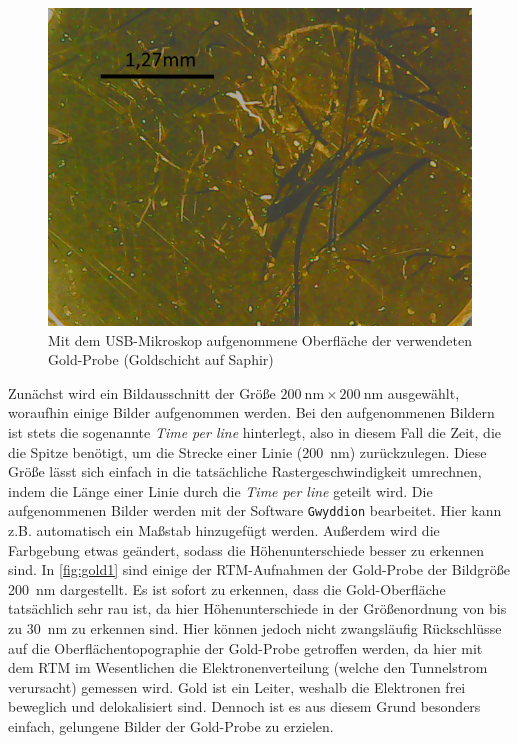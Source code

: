 \begin{figure}[H]
	\centering
	\includegraphics[width=0.6\linewidth]{../figs/gold_saphir.png}
	\caption{Mit dem USB-Mikroskop aufgenommene Oberfläche der verwendeten Gold-Probe (Goldschicht auf Saphir)}
	\label{fig:gold_saphir}
\end{figure}
Zunächst wird ein Bildausschnitt der Größe $\SI{200}{\nano \meter} \times \SI{200}{\nano \meter}$ ausgewählt, woraufhin einige Bilder aufgenommen werden.
Bei den aufgenommenen Bildern ist stets die sogenannte \textit{Time per line} hinterlegt, also in diesem Fall die Zeit, die die Spitze benötigt, um die Strecke
einer Linie (\SI{200}{\nano \meter}) zurückzulegen. Diese Größe lässt sich einfach in die tatsächliche Rastergeschwindigkeit umrechnen, indem die Länge einer Linie
durch die \textit{Time per line} geteilt wird. Die aufgenommenen Bilder werden mit der Software \texttt{Gwyddion} bearbeitet. Hier kann z.B. automatisch
ein Maßstab hinzugefügt werden. Außerdem wird die Farbgebung etwas geändert, sodass die Höhenunterschiede besser zu erkennen sind. In \cref{fig:gold1}
sind einige der RTM-Aufnahmen der Gold-Probe der Bildgröße \SI{200}{\nano \meter} dargestellt. Es ist sofort zu erkennen, dass die Gold-Oberfläche tatsächlich
sehr rau ist, da hier Höhenunterschiede in der Größenordnung von bis zu \SI{30}{\nano \meter} zu erkennen sind. Hier können jedoch nicht zwangsläufig Rückschlüsse
auf die Oberflächentopographie der Gold-Probe getroffen werden, da hier mit dem RTM im Wesentlichen die Elektronenverteilung (welche den Tunnelstrom verursacht) gemessen wird.
Gold ist ein Leiter, weshalb die Elektronen frei beweglich und delokalisiert sind. Dennoch ist es aus diesem Grund besonders einfach, gelungene Bilder
der Gold-Probe zu erzielen.
